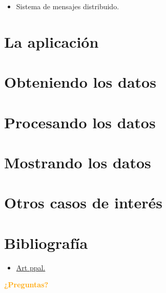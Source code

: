 \documentclass[dvipsnames]{beamer}
\begin{document}
	\begin{frame}
		\begin{itemize}
			\item Sistema de mensajes distribuido.
		\end{itemize}
	\end{frame}
	
	\section{La aplicación}
	
	\section{Obteniendo los datos}
	
	\section{Procesando los datos}
	
	\section{Mostrando los datos}

        \section{Otros casos de interés}


	
	\section{Bibliografía}
	
	\begin{frame}
		\begin{itemize}
		\item \href{https://www.infoq.com/articles/traffic-data-monitoring-iot-kafka-and-spark-streaming}{Art ppal.}
		\end{itemize}
	\end{frame}
	
	\begin{frame}[plain]
		\begin{center}
			\textcolor{orange}{\textbf{¿Preguntas?}}
		\end{center}
	\end{frame}
	
	
\end{document}
